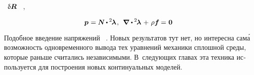 \begin{otherlanguage}{russian}
\noindent
{}~$\updelta\hspace{-0.1ex}\bm{R}$   ~, 

\nopagebreak\vspace{-0.2em}\begin{equation*}
\bm{p} \hspace{.1ex} = \mathboldN \hspace{.1ex} \dotp \hspace{-0.1ex} {^2\hspace{-0.2ex}\bm{\lambda}} \hspace{.2ex},
\:\:
\boldnabla \hspace{.1ex} \dotp \hspace{-0.1ex} {^2\hspace{-0.2ex}\bm{\lambda}} \hspace{.2ex} + \hspace{.2ex} \rho \bm{f} \hspace{-0.1ex} = \hspace{.1ex} \bm{0}
\end{equation*}



Подобное введение напряжений  ~\cite{rabotnov-mechanicsofdeformable}.
Новых результатов тут нет, но интересна сам\'{а} возможность одно\-времен\-ного вывода тех уравнений механики сплошной среды, которые раньше считались независимыми.
В~следующих главах эта техника используется для построения новых континуальных моделей.

\end{otherlanguage}

\section*{\small \wordforbibliography}

